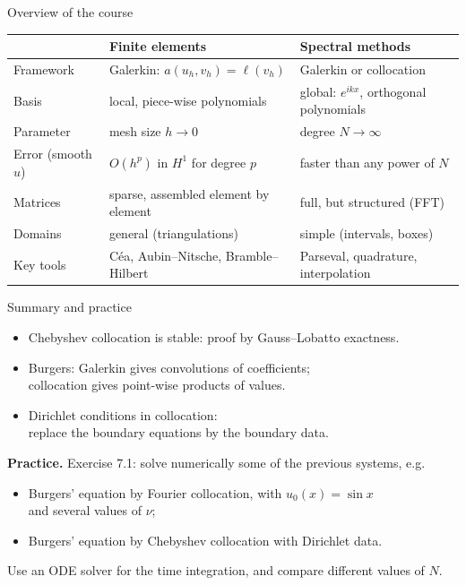 \begin{frame}{Overview of the course}
    \begin{center}
        \footnotesize
        \begin{tabular}{@{}lll@{}}
            \toprule
                               & Finite elements                       & Spectral methods                          \\
            \midrule
            Framework          & Galerkin: $a(u_h, v_h) = \ell(v_h)$   & Galerkin or collocation                   \\
            Basis              & local, piece-wise polynomials         & global: $e^{ikx}$, orthogonal polynomials \\
            Parameter          & mesh size $h \to 0$                   & degree $N \to \infty$                     \\
            Error (smooth $u$) & $O(h^{p})$ in $H^1$ for degree $p$    & faster than any power of $N$              \\
            Matrices           & sparse, assembled element by element  & full, but structured (FFT)                \\
            Domains            & general (triangulations)              & simple (intervals, boxes)                 \\
            Key tools          & Céa, Aubin--Nitsche, Bramble--Hilbert & Parseval, quadrature, interpolation       \\
            \bottomrule
        \end{tabular}
    \end{center}
    \bigskip
\end{frame}

\begin{frame}{Summary and practice}
    \begin{itemize}
        \item Chebyshev collocation is stable: proof by Gauss--Lobatto exactness.
        \item Burgers: Galerkin gives convolutions of coefficients;\\ collocation gives point-wise products of values.
        \item Dirichlet conditions in collocation:\\ replace the boundary equations by the boundary data.
    \end{itemize}
    \bigskip
    \textbf{Practice.} Exercise 7.1: solve numerically some of the previous systems, e.g.
    \begin{itemize}
        \item Burgers' equation by Fourier collocation, with $u_0(x) = \sin x$\\ and several values of $\nu$;
        \item Burgers' equation by Chebyshev collocation with Dirichlet data.
    \end{itemize}
    Use an ODE solver for the time integration, and compare different values of $N$.
\end{frame}
